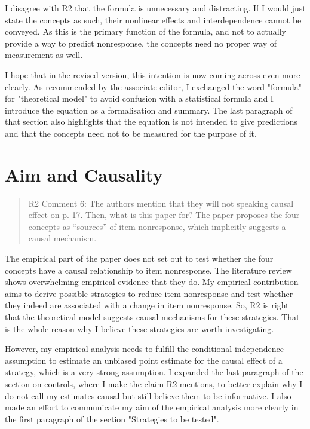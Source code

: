 \documentclass[a4paper, 12pt]{article}
\begin{document}
I disagree with R2 that the formula is unnecessary and distracting. If I would just state the concepts as such, their nonlinear effects and interdependence cannot be conveyed. As this is the primary function of the formula, and not to actually provide a way to predict nonresponse, the concepts need no proper way of measurement as well.

I hope that in the revised version, this intention is now coming across even more clearly. As recommended by the associate editor, I exchanged the word "formula" for "theoretical model" to avoid confusion with a statistical formula and I introduce the equation as a formalisation and summary. The last paragraph of that section also highlights that the equation is not intended to give predictions and that the concepts need not to be measured for the purpose of it.


\section{Aim and Causality}

\begin{quotation}
R2 Comment 6: The authors mention that they will not speaking causal effect on p. 17. Then, what is this paper for? The paper proposes the four concepts as “sources” of item nonresponse, which implicitly suggests a causal mechanism.
\end{quotation}

The empirical part of the paper does not set out to test whether the four concepts have a causal relationship to item nonresponse. The literature review shows overwhelming empirical evidence that they do. My empirical contribution aims to derive possible strategies to reduce item nonresponse and test whether they indeed are associated with a change in item nonresponse. So, R2 is right that the theoretical model suggests causal mechanisms for these strategies. That is the whole reason why I believe these strategies are worth investigating.

However, my empirical analysis needs to fulfill the conditional independence assumption to estimate an unbiased point estimate for the causal effect of a strategy, which is a very strong assumption. I expanded the last paragraph of the section on controls, where I make the claim R2 mentions, to better explain why I do not call my estimates causal but still believe them to be informative. I also made an effort to communicate my aim of the empirical analysis more clearly in the first paragraph of the section "Strategies to be tested".
\end{document}
